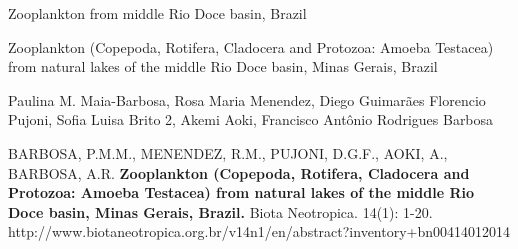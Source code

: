 \documentclass[scielo,showtrims,times,12pt,trimframe,conselho,spreadimages]{memoir}
\newcommand{\revista}{a}
\begin{document}

\begin{center}
Zooplankton from middle Rio Doce basin, Brazil

\medskip

\begin{bfseries}
Zooplankton (Copepoda, Rotifera, Cladocera and Protozoa: Amoeba Testacea) from natural
lakes of the middle Rio Doce basin, Minas Gerais, Brazil
\end{bfseries}

\medskip

Paulina M. Maia-Barbosa, Rosa Maria Menendez, Diego Guimarães Florencio Pujoni,
Sofia Luisa Brito 2, Akemi Aoki, Francisco Antônio Rodrigues Barbosa
\end{center}
\medskip

\noindent 
BARBOSA, P.M.M., MENENDEZ, R.M., PUJONI, D.G.F., AOKI, A., BARBOSA, A.R. \textbf{Zooplankton
(Copepoda, Rotifera, Cladocera and Protozoa: Amoeba Testacea) from natural lakes of the
middle Rio Doce basin, Minas Gerais, Brazil.} Biota Neotropica. 14(1): 1-20.
{http://www.biotaneotropica.org.br/v14n1/en/abstract?inventory+bn00414012014}
\medskip


\absleftindent=0pt 
\absrightindent=0pt
\end{document}
